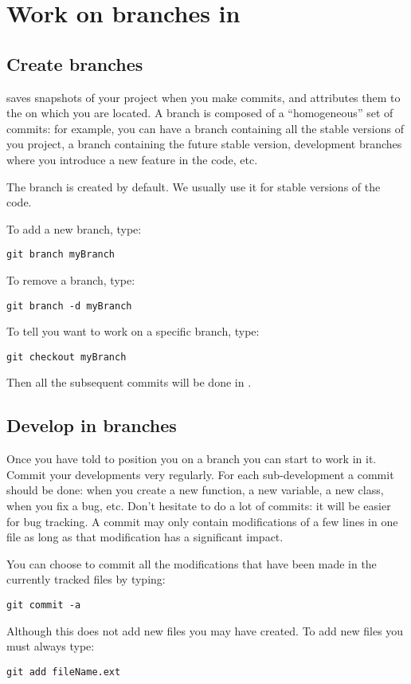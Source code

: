 \chapter{Work on branches in }\label{sec:useGit}

\section{Create branches}
 saves snapshots of your project when you make commits, and  attributes them to the  on which you are located.
A branch is composed of a ``homogeneous'' set of commits: for example, you can have a branch containing all the stable versions of you project, a branch containing the future stable version,
development branches where you introduce a new feature in the code, etc.

The branch  is created by default.
We usually use it for stable versions of the code.


To add a new branch, type:
\begin{lstlisting}
git branch myBranch
\end{lstlisting}
To remove a branch, type:
\begin{lstlisting}
git branch -d myBranch
\end{lstlisting}

To tell  you want to work on a specific branch, type:
\begin{lstlisting}
git checkout myBranch
\end{lstlisting}
Then all the subsequent commits will be done in .

\section{Develop in branches}

Once you have told  to position you on a branch you can start to work in it.
Commit your developments very regularly.
For each sub-development a commit should be done: when you create a new function, a new variable, a new class, when you fix a bug, etc.
Don't hesitate to do a lot of commits: it will be easier for bug tracking.
A commit may only contain modifications of a few lines in one file as long as that modification has a significant impact.

You can choose to commit all the modifications that have been made in the currently tracked files by typing:
\begin{lstlisting}
git commit -a
\end{lstlisting}
Although this does not add new files you may have created. To add new files you must always type:
\begin{lstlisting}
git add fileName.ext
\end{lstlisting}


